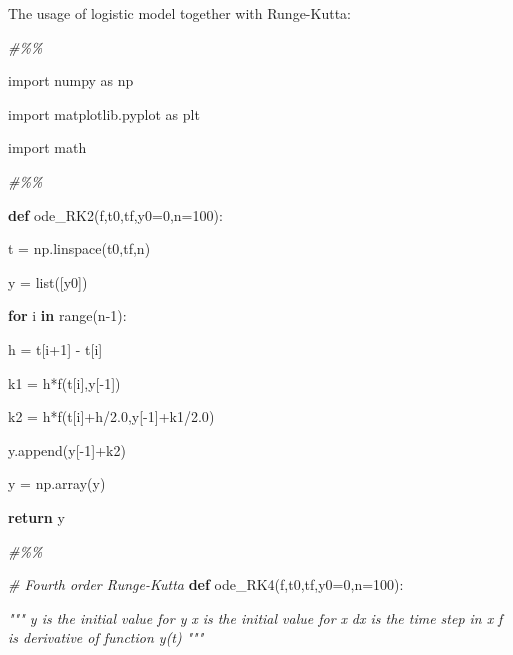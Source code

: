 \documentclass[
]{article}
\author{}
\date{}
\newenvironment{Shaded}{}{}
\newcommand{\BuiltInTok}[1]{#1}
\newcommand{\CommentTok}[1]{\textcolor[rgb]{0.38,0.63,0.69}{\textit{#1}}}
\newcommand{\ControlFlowTok}[1]{\textcolor[rgb]{0.00,0.44,0.13}{\textbf{#1}}}
\newcommand{\DecValTok}[1]{\textcolor[rgb]{0.25,0.63,0.44}{#1}}
\newcommand{\FloatTok}[1]{\textcolor[rgb]{0.25,0.63,0.44}{#1}}
\newcommand{\ImportTok}[1]{#1}
\newcommand{\KeywordTok}[1]{\textcolor[rgb]{0.00,0.44,0.13}{\textbf{#1}}}
\newcommand{\NormalTok}[1]{#1}
\newcommand{\OperatorTok}[1]{\textcolor[rgb]{0.40,0.40,0.40}{#1}}
\begin{document}
The usage of logistic model together with Runge-Kutta:

\begin{Shaded}
\begin{Highlighting}[]
\CommentTok{\#\%\%
}


\ImportTok{import}\NormalTok{ numpy }\ImportTok{as}\NormalTok{ np
}
\ImportTok{import}\NormalTok{ matplotlib.pyplot }\ImportTok{as}\NormalTok{ plt
}
\ImportTok{import}\NormalTok{ math
}


\CommentTok{\#\%\%
}


\KeywordTok{def}\NormalTok{ ode\_RK2(f,t0,tf,y0}\OperatorTok{=}\DecValTok{0}\NormalTok{,n}\OperatorTok{=}\DecValTok{100}\NormalTok{):
}
\NormalTok{    t }\OperatorTok{=}\NormalTok{ np.linspace(t0,tf,n)
}
\NormalTok{    y }\OperatorTok{=} \BuiltInTok{list}\NormalTok{([y0])
}
    \ControlFlowTok{for}\NormalTok{ i }\KeywordTok{in} \BuiltInTok{range}\NormalTok{(n}\OperatorTok{{-}}\DecValTok{1}\NormalTok{):
}
\NormalTok{        h }\OperatorTok{=}\NormalTok{ t[i}\OperatorTok{+}\DecValTok{1}\NormalTok{] }\OperatorTok{{-}}\NormalTok{ t[i]
}
\NormalTok{        k1 }\OperatorTok{=}\NormalTok{ h}\OperatorTok{*}\NormalTok{f(t[i],y[}\OperatorTok{{-}}\DecValTok{1}\NormalTok{])
}
\NormalTok{        k2 }\OperatorTok{=}\NormalTok{ h}\OperatorTok{*}\NormalTok{f(t[i]}\OperatorTok{+}\NormalTok{h}\OperatorTok{/}\FloatTok{2.0}\NormalTok{,y[}\OperatorTok{{-}}\DecValTok{1}\NormalTok{]}\OperatorTok{+}\NormalTok{k1}\OperatorTok{/}\FloatTok{2.0}\NormalTok{)
}
\NormalTok{        y.append(y[}\OperatorTok{{-}}\DecValTok{1}\NormalTok{]}\OperatorTok{+}\NormalTok{k2)
}


\NormalTok{    y }\OperatorTok{=}\NormalTok{ np.array(y)
}


    \ControlFlowTok{return}\NormalTok{ y
}


\CommentTok{\#\%\%
}


\CommentTok{\# Fourth order Runge{-}Kutta
}
\KeywordTok{def}\NormalTok{ ode\_RK4(f,t0,tf,y0}\OperatorTok{=}\DecValTok{0}\NormalTok{,n}\OperatorTok{=}\DecValTok{100}\NormalTok{):
}
    \CommentTok{""" y is the initial value for y
}
\CommentTok{        x is the initial value for x
}
\CommentTok{        dx is the time step in x
}
\CommentTok{        f is derivative of function y(t)
}
\CommentTok{    """}


\end{Highlighting}
\end{Shaded}
\end{document}

